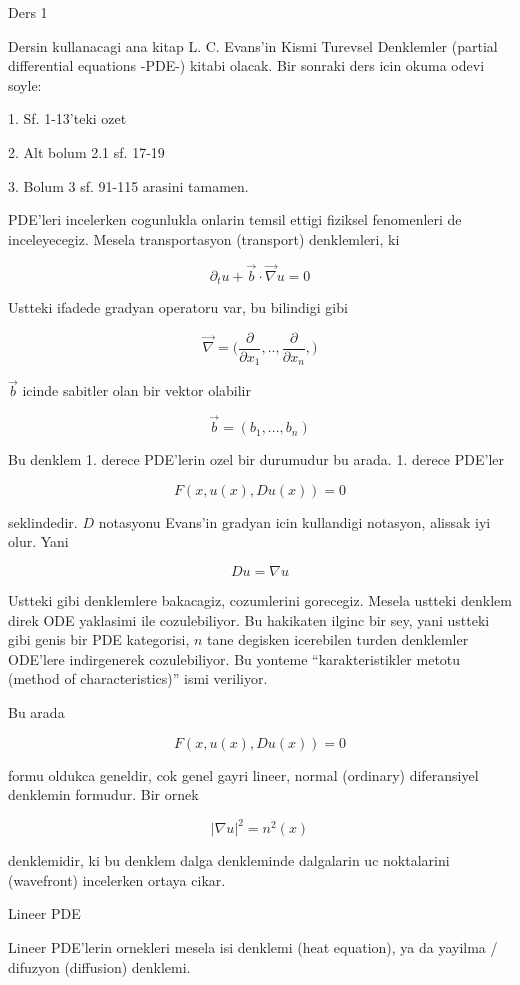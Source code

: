 \documentclass[12pt,fleqn]{article}
\begin{document}
Ders 1

Dersin kullanacagi ana kitap L. C. Evans'in Kismi Turevsel Denklemler
(partial differential equations -PDE-) kitabi olacak. Bir sonraki ders icin
okuma odevi soyle:

1. Sf. 1-13'teki ozet

2. Alt bolum 2.1 sf. 17-19

3. Bolum 3 sf. 91-115 arasini tamamen. 

PDE'leri incelerken cogunlukla onlarin temsil ettigi fiziksel fenomenleri
de inceleyecegiz. Mesela transportasyon (transport) denklemleri, ki

\[ \partial_t u + \vec{b} \cdot \vec{\nabla} u = 0 \]

Ustteki ifadede gradyan operatoru var, bu bilindigi gibi

\[ \vec{\nabla} = \bigg( 
\frac{\partial }{\partial x_1},.., 
\frac{\partial }{\partial x_n},
\bigg)
\]

$\vec{b}$ icinde sabitler olan bir vektor olabilir

\[ \vec{b} = (b_1,...,b_n)
 \]

Bu denklem 1. derece PDE'lerin ozel bir durumudur bu arada. 1. derece
PDE'ler 

\[ F(x, u(x), Du(x)) = 0 \]

seklindedir. $D$ notasyonu Evans'in gradyan icin kullandigi notasyon,
alissak iyi olur. Yani

\[ Du = \nabla u \]

Ustteki gibi denklemlere bakacagiz, cozumlerini gorecegiz. Mesela ustteki
denklem direk ODE yaklasimi ile cozulebiliyor. Bu hakikaten ilginc bir sey,
yani ustteki gibi genis bir PDE kategorisi, $n$ tane degisken icerebilen
turden denklemler ODE'lere indirgenerek cozulebiliyor. Bu yonteme
``karakteristikler metotu (method of characteristics)'' ismi veriliyor.

Bu arada

\[ F(x, u(x), Du(x)) = 0 \]

formu oldukca geneldir, cok genel gayri lineer, normal (ordinary)
diferansiyel denklemin formudur. Bir ornek

\[ |\nabla u|^2 = n^2(x) \]

denklemidir, ki bu denklem dalga denkleminde dalgalarin uc noktalarini
(wavefront) incelerken ortaya cikar. 

Lineer PDE

Lineer PDE'lerin ornekleri mesela isi denklemi (heat equation), ya da
yayilma / difuzyon (diffusion) denklemi.
\end{document}
